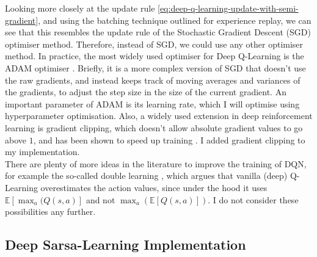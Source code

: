 Looking more closely at the update rule \ref{eq:deep-q-learning-update-with-semi-gradient}, and using the batching technique outlined for experience replay, we can see that this resembles the update rule of the Stochastic Gradient Descent (SGD) optimiser method. Therefore, instead of SGD, we could use any other optimiser method. In practice, the most widely used optimiser for Deep Q-Learning is the ADAM optimiser \cite{kingma2015adamoptimiser}. Briefly, it is a more complex version of SGD that doesn't use the raw gradients, and instead keeps track of moving averages and variances of the gradients, to adjust the step size in the size of the current gradient. An important parameter of ADAM is its learning rate, which I will optimise using hyperparameter optimisation. Also, a widely used extension in deep reinforcement learning is gradient clipping, which doesn't allow absolute gradient values to go above $1$, and has been shown to speed up training \cite{zhang2020gradientclipping}. I added gradient clipping to my implementation.\\



There are plenty of more ideas in the literature to improve the training of DQN, for example the so-called double learning \cite{hasselt2010doubleqlearning}, which argues that vanilla (deep) Q-Learning overestimates the action values, since under the hood it uses $\mathbb{E}[\max_a(Q(s,a)]$ and not $\max_a(\mathbb{E}[Q(s,a)])$. I do not consider these possibilities any further.


\subsection{Deep Sarsa-Learning Implementation}




